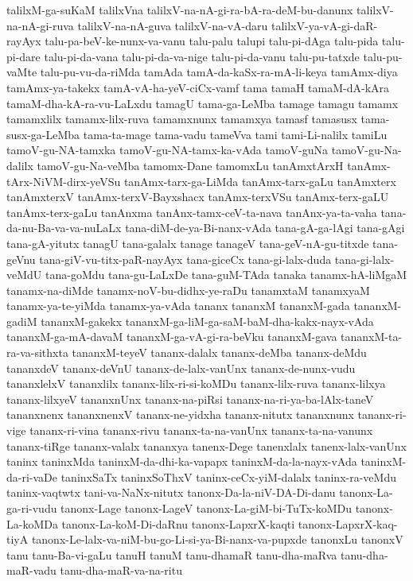 {talilxM-ga-suKaM
talilxVna
talilxV-na-nA-gi-ra-bA-ra-deM-bu-danunx
talilxV-na-nA-gi-ruva
talilxV-na-nA-guva
talilxV-na-vA-daru
talilxV-ya-vA-gi-daR-rayAyx
talu-pa-beV-ke-nunx-va-vanu
talu-palu
talupi
talu-pi-dAga
talu-pida
talu-pi-dare
talu-pi-da-vana
talu-pi-da-va-nige
talu-pi-da-vanu
talu-pu-tatxde
talu-pu-vaMte
talu-pu-vu-da-riMda
tamAda
tamA-da-kaSx-ra-mA-li-keya
tamAmx-diya
tamAmx-ya-takekx
tamA-vA-ha-yeV-ciCx-vamf
tama
tamaH
tamaM-dA-kAra
tamaM-dha-kA-ra-vu-LaLxdu
tamagU
tama-ga-LeMba
tamage
tamagu
tamamx
tamamxlilx
tamamx-lilx-ruva
tamamxnunx
tamamxya
tamasf
tamasusx
tama-susx-ga-LeMba
tama-ta-mage
tama-vadu
tameVva
tami
tami-Li-nalilx
tamiLu
tamoV-gu-NA-tamxka
tamoV-gu-NA-tamx-ka-vAda
tamoV-guNa
tamoV-gu-Na-dalilx
tamoV-gu-Na-veMba
tamomx-Dane
tamomxLu
tanAmxtArxH
tanAmx-tArx-NiVM-dirx-yeVSu
tanAmx-tarx-ga-LiMda
tanAmx-tarx-gaLu
tanAmxterx
tanAmxterxV
tanAmx-terxV-Bayxshacx
tanAmx-terxVSu
tanAmx-terx-gaLU
tanAmx-terx-gaLu
tanAnxma
tanAnx-tamx-ceV-ta-nava
tanAnx-ya-ta-vaha
tana-da-nu-Ba-va-va-nuLaLx
tana-diM-de-ya-Bi-nanx-vAda
tana-gA-ga-lAgi
tana-gAgi
tana-gA-yitutx
tanagU
tana-galalx
tanage
tanageV
tana-geV-nA-gu-titxde
tana-geVnu
tana-giV-vu-titx-paR-nayAyx
tana-giceCx
tana-gi-lalx-duda
tana-gi-lalx-veMdU
tana-goMdu
tana-gu-LaLxDe
tana-guM-TAda
tanaka
tanamx-hA-liMgaM
tanamx-na-diMde
tanamx-noV-bu-didhx-ye-raDu
tanamxtaM
tanamxyaM
tanamx-ya-te-yiMda
tanamx-ya-vAda
tananx
tananxM
tananxM-gada
tananxM-gadiM
tananxM-gakekx
tananxM-ga-liM-ga-saM-baM-dha-kakx-nayx-vAda
tananxM-ga-mA-davaM
tananxM-ga-vA-gi-ra-beVku
tananxM-gava
tananxM-ta-ra-va-sithxta
tananxM-teyeV
tananx-dalalx
tananx-deMba
tananx-deMdu
tananxdeV
tananx-deVnU
tananx-de-lalx-vanUnx
tananx-de-nunx-vudu
tananxlelxV
tananxlilx
tananx-lilx-ri-si-koMDu
tananx-lilx-ruva
tananx-lilxya
tananx-lilxyeV
tananxnUnx
tananx-na-piRsi
tananx-na-ri-ya-ba-lAlx-taneV
tananxnenx
tananxnenxV
tananx-ne-yidxha
tananx-nitutx
tananxnunx
tananx-ri-vige
tananx-ri-vina
tananx-rivu
tananx-ta-na-vanUnx
tananx-ta-na-vanunx
tananx-tiRge
tananx-valalx
tananxya
tanenx-Dege
tanenxlalx
tanenx-lalx-vanUnx
taninx
taninxMda
taninxM-da-dhi-ka-vapapx
taninxM-da-la-nayx-vAda
taninxM-da-ri-vaDe
taninxSaTx
taninxSoThxV
taninx-ceCx-yiM-dalalx
taninx-ra-veMdu
taninx-vaqtwtx
tani-va-NaNx-nitutx
tanonx-Da-la-niV-DA-Di-danu
tanonx-La-ga-ri-vudu
tanonx-Lage
tanonx-LageV
tanonx-La-giM-bi-TuTx-koMDu
tanonx-La-koMDa
tanonx-La-koM-Di-daRnu
tanonx-LapxrX-kaqti
tanonx-LapxrX-kaq-tiyA
tanonx-Le-lalx-va-niM-bu-go-Li-si-ya-Bi-nanx-va-pupxde
tanonxLu
tanonxV
tanu
tanu-Ba-vi-gaLu
tanuH
tanuM
tanu-dhamaR
tanu-dha-maRva
tanu-dha-maR-vadu
tanu-dha-maR-va-na-ritu
}
